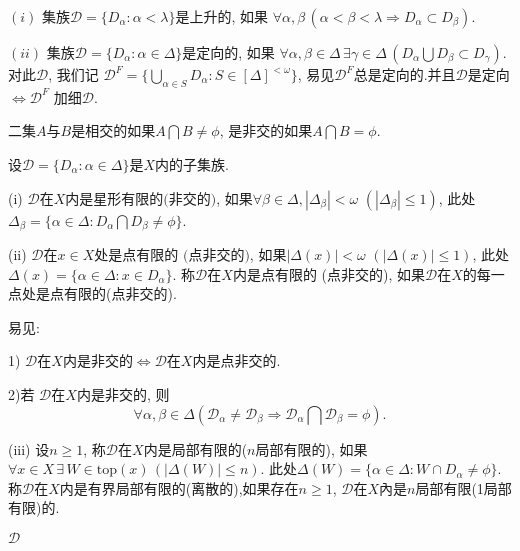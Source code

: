 \documentclass[main.tex]{subfiles}
\begin{document}
\begin{definition}
	$(i)$
	集族$\mathscr{D}=\{D_\alpha: \alpha<\lambda\}$是上升的,
如果
$\forall\alpha, \beta \,(\alpha < \beta < \lambda \Rightarrow D_\alpha \subset D_\beta )$.

$(ii)$ 集族$\mathscr{D}=\{D_\alpha: \alpha\in\Delta\}$是定向的,
如果
$\forall\alpha, \beta\in\Delta\,\exists \gamma\in \Delta\,
(D_\alpha \bigcup D_\beta \subset D_\gamma)$.
对此$\mathscr{D}$, 我们记
$\mathscr{D}^F = \{\bigcup_{\alpha\in S} D_\alpha: S\in [\Delta]^{<\omega}\}$,
易见$\mathscr{D}^F$总是定向的.并且$\mathscr{D}$是定向
$\Leftrightarrow \mathscr{D}^F$ 加细$\mathscr{D}$.
\end{definition}
二集$A$与$B$是相交的如果$A\bigcap B\ne \phi$, 
是非交的如果$A\bigcap B=\phi$.

\begin{definition}
设$\mathscr{D}=\{D_\alpha: \alpha\in \Delta\}$是$X$内的子集族.

\textnormal{(i)} $\mathscr{D}$在$X$内是星形有限的$($非交的$)$, 如果$\forall\beta\in\Delta, |\Delta_\beta| < \omega$ $(|\Delta_\beta| \le 1)$, 此处
$\Delta_\beta = \{\alpha\in\Delta: D_\alpha\bigcap D_\beta \ne \phi\}$.
 
\textnormal{(ii)} $\mathscr{D}$在$x\in X$处是点有限的 $($点非交的$)$, 如果$|\Delta(x)| < \omega$ $(|\Delta(x)| \le 1)$, 此处
$\Delta(x) = \{\alpha\in\Delta: x\in D_\alpha\}$.
称$\mathscr{D}$在$X$内是点有限的 
\textnormal{(}点非交的\textnormal{)}, 如果$\mathscr{D}$在$X$的每一点处是点有限的\textnormal{(}点非交的\textnormal{)}.
\end{definition}
易见:

1) $\mathscr{D}$在$X$内是非交的$\Leftrightarrow$$\mathscr{D}$在$X$内是点非交的.

2)若 $\mathscr{D}$在$X$内是非交的, 则
$$\forall \alpha,\beta\in\Delta (\mathscr{D}_\alpha \ne \mathscr{D}_\beta
\Rightarrow\mathscr{D}_\alpha\bigcap\mathscr{D}_\beta = \phi).$$

{\kaishu
(iii) 设$n\ge 1$, 称$\mathscr{D}$在$X$内是局部有限的($n$局部有限的),
如果$\forall x\in X\, \exists\, W\in\textrm{top}(x)\, (|\Delta(W)| \le n)$.
此处$\Delta(W)= \{\alpha\in \Delta: W\cap D_\alpha \ne \phi\}$.
称$\mathscr{D}$在$X$内是有界局部有限的(离散的),如果存在$n\ge 1$, 
$\mathscr{D}$在$X$內是$n$局部有限(1局部有限)的.
}

\begin{proposition}
$\mathscr{D}$
\end{proposition}

\end{document}
